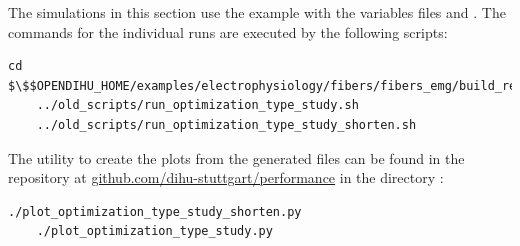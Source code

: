 
\begin{reproduce_no_break}
  The simulations in this section use the example 
   with the variables files  and .
  The commands for the individual runs are executed by the following scripts:
  \begin{lstlisting}[columns=fullflexible,breaklines=true,postbreak=\mbox{\textcolor{gray}{$\hookrightarrow$}\space}]
    cd $\$$OPENDIHU_HOME/examples/electrophysiology/fibers/fibers_emg/build_release
    ../old_scripts/run_optimization_type_study.sh
    ../old_scripts/run_optimization_type_study_shorten.sh
  \end{lstlisting}
  The utility to create the plots from the generated  files can be found in the repository at \href{https://github.com/dihu-stuttgart/performance}{github.com/dihu-stuttgart/performance}
  in the directory :
  \begin{lstlisting}[columns=fullflexible,breaklines=true,postbreak=\mbox{\textcolor{gray}{$\hookrightarrow$}\space}]
    ./plot_optimization_type_study_shorten.py
    ./plot_optimization_type_study.py
  \end{lstlisting}
\end{reproduce_no_break}

